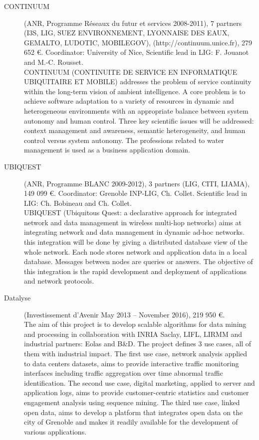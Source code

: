 \begin{description}
\item[CONTINUUM] (ANR, Programme R{\'e}seaux du futur et services 2008-2011),  7 partners (I3S, LIG, SUEZ ENVIRONNEMENT, LYONNAISE DES EAUX, GEMALTO, LUDOTIC, MOBILEGOV), (http://continuum.unice.fr), 279 652 \euro. Coordinator: University of Nice, Scientific lead in LIG: F. Jouanot and M.-C. Rousset. \\
CONTINUUM (CONTINUITE DE SERVICE EN INFORMATIQUE UBIQUITAIRE ET MOBILE) addresses the problem of service continuity within the long-term vision of ambient intelligence. A core problem is to achieve software adaptation to a variety of resources in dynamic and heterogeneous environments with an appropriate balance between system autonomy and human control. Three key scientific issues will be addressed: context management and awareness, semantic heterogeneity, and human control versus system autonomy. The professions related to water management is used as a business application domain.

\item[UBIQUEST] (ANR, Programme BLANC 2009-2012), 3 partners (LIG, CITI, LIAMA), 149 099 \euro. Coordinator: Grenoble INP-LIG, Ch. Collet. Scientific lead in LIG: Ch. Bobineau and Ch. Collet. \\
UBIQUEST (Ubiquitous Quest: a declarative approach for integrated network and data management in wireless multi-hop networks) aims at integrating network and data management in dynamic ad-hoc networks. this integration will be done by giving a distributed database view of the whole network. Each node stores network and application data in a local database. Messages between nodes are queries or answers. The objective of this integration is the rapid development and deployment of applications and network protocols.

\item[Datalyse] (Investissement d'Avenir May 2013 -- November 2016), 219 950 \euro. \\
The aim of this project is to develop scalable algorithms for data mining and processing in collaboration with INRIA Saclay, LIFL, LIRMM and industrial partners: Eolas and B\&D. The project defines 3 use cases, all of them with industrial impact. The first use case, network analysis applied to data centers datasets, aims to provide interactive traffic monitoring interfaces including traffic aggregation over time abnormal traffic identification. The second use case, digital marketing, applied to server and application logs, aims to provide customer-centric statistics and customer engagement analysis using sequence mining. The third use case, linked open data, aims to develop a platform that integrates open data on the city of Grenoble and makes it readily available for the development of various applications.


\end{description}
